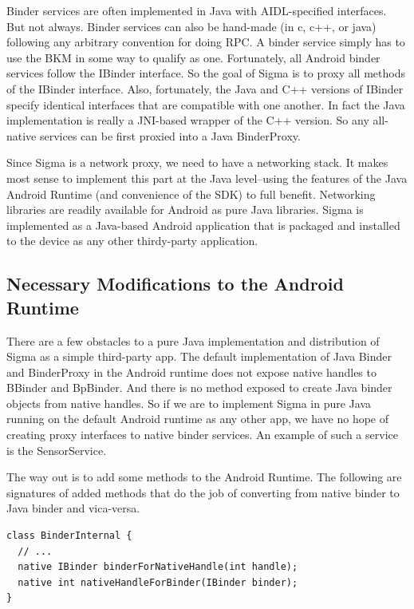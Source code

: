 \documentclass[prodmode]{acmlarge}
\begin{document}
Binder services are often implemented in Java with AIDL-specified interfaces. But not always. Binder services can also be hand-made (in c, c++, or java) following any arbitrary convention for doing RPC. A binder service simply has to use the BKM in some way to qualify as one. Fortunately, all Android binder services follow the IBinder interface. So the goal of Sigma is to proxy all methods of the IBinder interface. Also, fortunately, the Java and C++ versions of IBinder specify identical interfaces that are compatible with one another. In fact the Java implementation is really a JNI-based wrapper of the C++ version. So any all-native services can be first proxied into a Java BinderProxy.

Since Sigma is a network proxy, we need to have a networking stack. It makes most sense to implement this part at the Java level--using the features of the Java Android Runtime (and convenience of the SDK) to full benefit. Networking libraries are readily available for Android as pure Java libraries. Sigma is implemented as a Java-based Android application that is packaged and installed to the device as any other thirdy-party application.

\subsection{Necessary Modifications to the Android Runtime}
There are a few obstacles to a pure Java implementation and distribution of Sigma as a simple third-party app. The default implementation of Java Binder and BinderProxy in the Android runtime does not expose native handles to BBinder and BpBinder. And there is no method exposed to create Java binder objects from native handles. So if we are to implement Sigma in pure Java running on the default Android runtime as any other app, we have no hope of creating proxy interfaces to native binder services. An example of such a service is the SensorService.

The way out is to add some methods to the Android Runtime. The following are signatures of added methods that do the job of converting from native binder to Java binder and vica-versa.

\begin{Verbatim}[samepage=true]
class BinderInternal {
  // ...
  native IBinder binderForNativeHandle(int handle);
  native int nativeHandleForBinder(IBinder binder);
}
\end{Verbatim}
\end{document}
